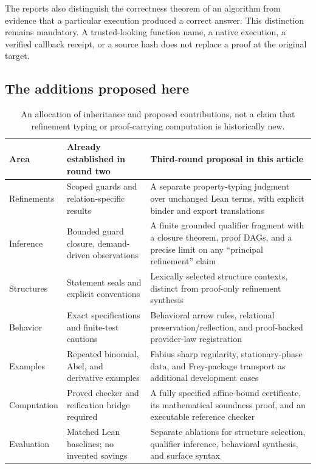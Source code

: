 \documentclass[11pt,a4paper]{article}
\theoremstyle{definition}
\theoremstyle{remark}
\begin{document}
The reports also distinguish the correctness theorem of an algorithm from evidence that a particular execution produced a correct answer. This distinction remains mandatory. A trusted-looking function name, a native execution, a verified callback receipt, or a source hash does not replace a proof at the original target.

\subsection{The additions proposed here}
\begin{table}[htbp]
\small
\begin{tabularx}{\textwidth}{@{}L{31mm}YY@{}}
\toprule
Area & Already established in round two & Third-round proposal in this article\\
\midrule
Refinements & Scoped guards and relation-specific results & A separate property-typing judgment over unchanged Lean terms, with explicit binder and export translations\\
Inference & Bounded guard closure, demand-driven observations & A finite grounded qualifier fragment with a closure theorem, proof DAGs, and a precise limit on any ``principal refinement'' claim\\
Structures & Statement seals and explicit conventions & Lexically selected structure contexts, distinct from proof-only refinement synthesis\\
Behavior & Exact specifications and finite-test cautions & Behavioral arrow rules, relational preservation/reflection, and proof-backed provider-law registration\\
Examples & Repeated binomial, Abel, and derivative examples & Fabius sharp regularity, stationary-phase data, and Frey-package transport as additional development cases\\
Computation & Proved checker and reification bridge required & A fully specified affine-bound certificate, its mathematical soundness proof, and an executable reference checker\\
Evaluation & Matched Lean baselines; no invented savings & Separate ablations for structure selection, qualifier inference, behavioral synthesis, and surface syntax\\
\bottomrule
\end{tabularx}
\caption{An allocation of inheritance and proposed contributions, not a claim that refinement typing or proof-carrying computation is historically new.}
\end{table}
\end{document}
